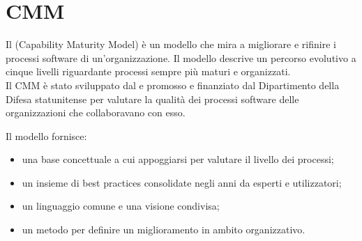 
\section{CMM}
\label{appendice A}

Il  (Capability Maturity Model) è un modello che mira a migliorare e rifinire i processi software di un'organizzazione. Il modello descrive un percorso evolutivo a cinque livelli riguardante processi sempre più maturi e organizzati. \\
Il CMM è stato sviluppato dal  e promosso e finanziato dal Dipartimento della Difesa statunitense per valutare la qualità dei processi software delle organizzazioni che collaboravano con esso.

Il modello fornisce:
\begin{itemize}
	\item una base concettuale a cui appoggiarsi per valutare il livello dei processi;
\item un insieme di best practices consolidate negli anni da esperti e utilizzatori;
\item un linguaggio comune e una visione condivisa;
\item un metodo per definire un miglioramento in ambito organizzativo.
\end{itemize}

